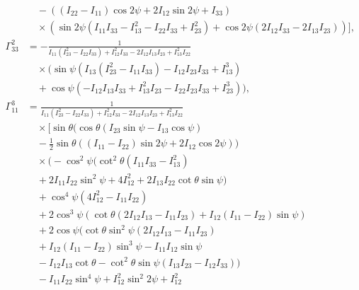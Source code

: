 \documentclass[lineno, pdflatex,sn-mathphys-ay]{sn-jnl}
\theoremstyle{thmstyleone}%
\theoremstyle{thmstyletwo}%
\theoremstyle{thmstylethree}%
\begin{document}
\begin{appendices}
\begin{align}
    &\quad -((I_{22}-I_{11}) \cos 2\psi+2 I_{12} \sin 2\psi+I_{33}) \nonumber \\
    &\quad \times \left(\sin 2\psi \left(I_{11} I_{33}-I_{13}^2-I_{22} I_{33}+I_{23}^2\right)+\cos 2\psi (2 I_{12} I_{33}-2 I_{13} I_{23})\right) \bigg], \nonumber \\
    \Gamma^{2}_{33} &= -\frac{1}{I_{11} \left(I_{23}^2-I_{22} I_{33}\right)+I_{12}^2 I_{33}-2 I_{12} I_{13} I_{23}+I_{13}^2 I_{22}} \nonumber \\
    &\quad \times \Big( \sin \psi \left(I_{13} \left(I_{23}^2-I_{11} I_{33}\right)-I_{12} I_{23} I_{33}+I_{13}^3\right) \nonumber \\
    &\quad + \cos \psi \left(-I_{12} I_{13} I_{33}+I_{13}^2 I_{23}-I_{22} I_{23} I_{33}+I_{23}^3\right) \Big), \nonumber \\
    \Gamma^{3}_{11} &= \frac{1}{I_{11} \left(I_{23}^2-I_{22} I_{33}\right)+I_{12}^2 I_{33}-2 I_{12} I_{13} I_{23}+I_{13}^2 I_{22}} \nonumber \\
    &\quad \times \bigg[ \sin \theta \bigg(\cos \theta (I_{23} \sin \psi-I_{13} \cos \psi) \nonumber \\
    &\quad -\frac{1}{2} \sin \theta ((I_{11}-I_{22}) \sin 2\psi+2 I_{12} \cos 2\psi)\bigg) \nonumber \\
    &\quad \times \bigg(-\cos ^2\psi \Big(\cot ^2\theta \left(I_{11} I_{33}-I_{13}^2\right) \nonumber \\
    &\quad +2 I_{11} I_{22} \sin ^2\psi+4 I_{12}^2+2 I_{13} I_{22} \cot \theta \sin \psi\Big) \nonumber \\
    &\quad +\cos ^4\psi \left(4 I_{12}^2-I_{11} I_{22}\right) \nonumber \\
    &\quad +2 \cos ^3\psi (\cot \theta (2 I_{12} I_{13}-I_{11} I_{23})+I_{12} (I_{11}-I_{22}) \sin \psi) \nonumber \\
    &\quad +2 \cos \psi \Big(\cot \theta \sin ^2\psi (2 I_{12} I_{13}-I_{11} I_{23}) \nonumber \\
    &\quad +I_{12} (I_{11}-I_{22}) \sin ^3\psi -I_{11} I_{12} \sin \psi \nonumber \\
    &\quad -I_{12} I_{13} \cot \theta-\cot ^2\theta \sin \psi (I_{13} I_{23}-I_{12} I_{33})\Big) \nonumber \\
    &\quad -I_{11} I_{22} \sin ^4\psi+I_{12}^2 \sin ^2 2\psi+I_{12}^2 \nonumber \\

\end{align}
\end{appendices}
\end{document}
